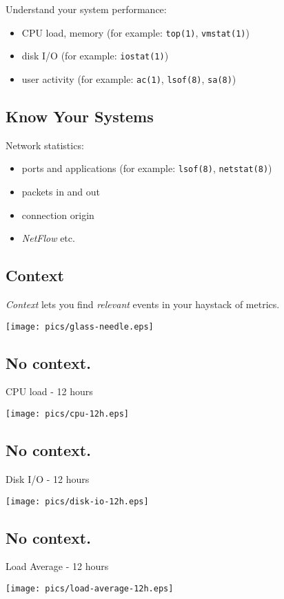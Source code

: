 \documentclass[xga]{xdvislides}
\begin{document}
\addvspace{.5in}
Understand your system performance:
\begin{itemize}
	\item CPU load, memory (for example: {\tt top(1)}, {\tt vmstat(1)})
	\item disk I/O (for example: {\tt iostat(1)})
	\item user activity (for example: {\tt ac(1)}, {\tt lsof(8)}, {\tt sa(8)})
\end{itemize}

\subsection{Know Your Systems}
Network statistics:
\begin{itemize}
	\item ports and applications (for example: {\tt lsof(8)}, {\tt netstat(8)})
	\item packets in and out
	\item connection origin
	\item {\em NetFlow} etc.
\end{itemize}

\subsection{Context}
{\em Context} lets you find {\em relevant} events in
your haystack of metrics.

\begin{center}
	\texttt{[image: pics/glass-needle.eps]}
\end{center}

\subsection{No context.}
CPU load - 12 hours
\begin{center}
	\texttt{[image: pics/cpu-12h.eps]}
\end{center}

\subsection{No context.}
Disk I/O - 12 hours
\begin{center}
	\texttt{[image: pics/disk-io-12h.eps]}
\end{center}

\subsection{No context.}
Load Average - 12 hours
\begin{center}
	\texttt{[image: pics/load-average-12h.eps]}
\end{center}
\end{document}
